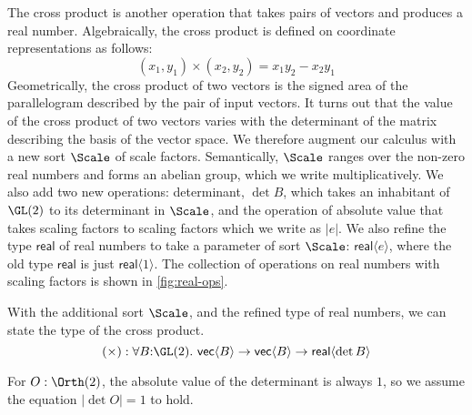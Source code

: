 The cross product is another operation that takes pairs of vectors and
produces a real number. Algebraically, the cross product is defined on
coordinate representations as follows:
\begin{displaymath}
  (x_1,y_1) \times (x_2,y_2) = x_1y_2 - x_2y_1
\end{displaymath}
Geometrically, the cross product of two vectors is the signed area of
the parallelogram described by the pair of input vectors. It turns out
that the value of the cross product of two vectors varies with the
determinant of the matrix describing the basis of the vector space. We
therefore augment our calculus with a new sort $\Scale$ of scale
factors. Semantically, $\Scale$ ranges over the non-zero real numbers
and forms an abelian group, which we write multiplicatively. We also
add two new operations: determinant, $\det B$, which takes an
inhabitant of $\GL(2)$ to its determinant in $\Scale$, and the
operation of absolute value that takes scaling factors to scaling
factors which we write as $|e|$. We also refine the type
$\mathsf{real}$ of real numbers to take a parameter of sort $\Scale$:
$\mathsf{real}\langle e \rangle$, where the old type $\mathsf{real}$
is just $\mathsf{real}\langle 1 \rangle$. The collection of operations
on real numbers with scaling factors is shown in
\autoref{fig:real-ops}.

With the additional sort $\Scale$, and the refined type of real
numbers, we can state the type of the cross product.
\begin{displaymath}
  (\times) : \forall B \mathord: \GL(2).\ \mathsf{vec}\langle B \rangle \to \mathsf{vec}\langle B \rangle \to \mathsf{real}\langle \det B \rangle
\end{displaymath}

For $O : \Orth(2)$, the absolute value of the determinant is always
$1$, so we assume the equation $|\det O| = 1$ to hold.

